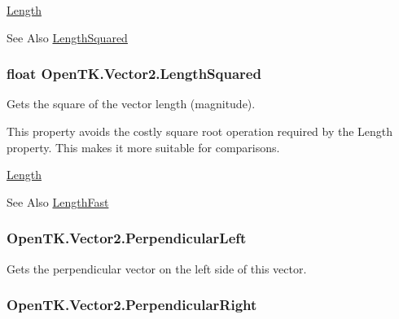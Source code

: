 \hyperlink{struct_open_t_k_1_1_vector2_a4e59d4f3f2a003e47705241fb3018023}{Length} \begin{DoxySeeAlso}{See Also}
\hyperlink{struct_open_t_k_1_1_vector2_aba3ddfbb5955550d76df2b9f1bed585c}{Length\-Squared}


\end{DoxySeeAlso}
\hypertarget{struct_open_t_k_1_1_vector2_aba3ddfbb5955550d76df2b9f1bed585c}{
\subsubsection[{Length\-Squared}]{\setlength{\rightskip}{0pt plus 5cm}float Open\-T\-K.\-Vector2.\-Length\-Squared\hspace{0.3cm}{\ttfamily [get]}}}\label{struct_open_t_k_1_1_vector2_aba3ddfbb5955550d76df2b9f1bed585c}


Gets the square of the vector length (magnitude). 

This property avoids the costly square root operation required by the Length property. This makes it more suitable for comparisons. 

\hyperlink{struct_open_t_k_1_1_vector2_a4e59d4f3f2a003e47705241fb3018023}{Length} \begin{DoxySeeAlso}{See Also}
\hyperlink{struct_open_t_k_1_1_vector2_a3ca5088bcfc730ee241e3851ac49eab4}{Length\-Fast}


\end{DoxySeeAlso}
\hypertarget{struct_open_t_k_1_1_vector2_a78a25728baa8a1707d8430fee480a57a}{
\subsubsection[{Perpendicular\-Left}]{ Open\-T\-K.\-Vector2.\-Perpendicular\-Left\hspace{0.3cm}{\ttfamily [get]}}}\label{struct_open_t_k_1_1_vector2_a78a25728baa8a1707d8430fee480a57a}


Gets the perpendicular vector on the left side of this vector. 

\hypertarget{struct_open_t_k_1_1_vector2_aa1d47fbd2f965d0bd84d1d404da1fb9a}{
\subsubsection[{Perpendicular\-Right}]{ Open\-T\-K.\-Vector2.\-Perpendicular\-Right\hspace{0.3cm}{\ttfamily [get]}}}\label{struct_open_t_k_1_1_vector2_aa1d47fbd2f965d0bd84d1d404da1fb9a}


